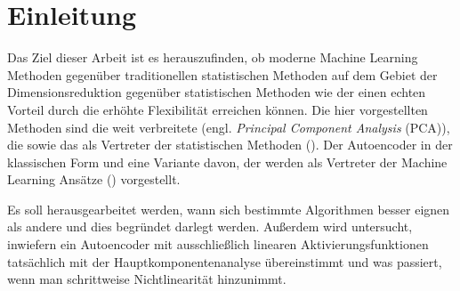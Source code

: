 \chapter{Einleitung}
\label{ch:Enleitung}


Das Ziel dieser Arbeit ist es herauszufinden, ob moderne Machine Learning Methoden gegenüber
traditionellen statistischen Methoden auf dem Gebiet der Dimensionsreduktion gegenüber
statistischen Methoden wie der einen echten Vorteil durch die erhöhte Flexibilität erreichen
können. Die hier vorgestellten Methoden sind die weit verbreitete 
(engl. \textit{Principal Component Analysis} (PCA)), die  sowie das
 als Vertreter der statistischen Methoden
(). Der Autoencoder in der klassischen Form und eine
Variante davon, der  werden als Vertreter der Machine Learning
Ansätze () vorgestellt.

Es soll herausgearbeitet werden, wann sich bestimmte Algorithmen besser eignen als andere und dies
begründet darlegt werden. Außerdem wird untersucht, inwiefern ein Autoencoder mit ausschließlich
linearen Aktivierungsfunktionen tatsächlich mit der Hauptkomponentenanalyse übereinstimmt und was
passiert, wenn man schrittweise Nichtlinearität hinzunimmt.

